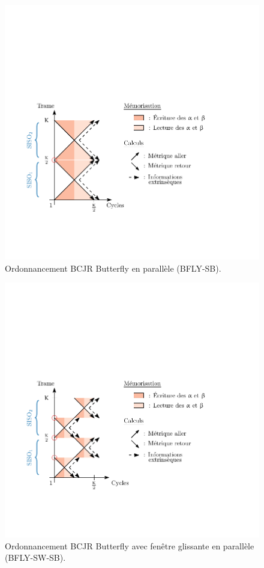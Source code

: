 \begin{figure}[!h]
    \centering
    \includegraphics{main/ch4_fig/ipe/BFLY_SB+LEG.pdf}
	\caption{Ordonnancement BCJR Butterfly en parallèle (BFLY-SB). \label{fig:sisos_par}}
\end{figure}    
\begin{figure}[!h]
    \centering
    \includegraphics{main/ch4_fig/ipe/BFLY_SB_SW+LEG.pdf}
	\caption{Ordonnancement BCJR Butterfly avec fenêtre glissante en parallèle (BFLY-SW-SB). \label{fig:sisos_par_sb}}
\end{figure}

